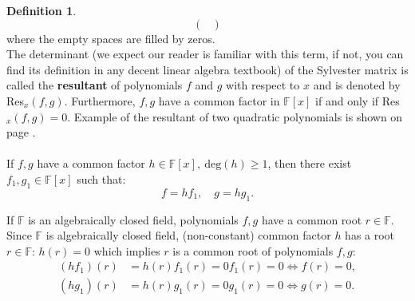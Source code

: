 \documentclass[thesis=M,english]{FITthesis}[2012/10/20]
\theoremstyle{remark}
\theoremstyle{definition}
\newtheorem{DF}{Definition}[section]
\begin{document}
\begin{DF}
$$\begin{pmatrix}
\end{pmatrix}
$$
where the empty spaces are filled by zeros. \\
\noindent The determinant (we expect our reader is familiar with this term, if not, you can find its definition in any decent linear algebra textbook) of the Sylvester matrix is called the \textbf{resultant} of polynomials $f$ and $g$ with respect to $x$ and is denoted by Res$_{x}(f,g)$. Furthermore, $f,g$ have a common factor in $\mathbb{F}[x]$ if and only if Res$_x(f,g) = 0$. Example of the resultant of two quadratic polynomials is shown on page \pageref{resExample}. \\ \\
\noindent If $f,g$ have a common factor $h \in \mathbb{F}[x],\ \text{deg}(h) \geq 1$, then there exist $f_1, g_1 \in \mathbb{F}[x]$ such that:
$$
f = hf_1, \quad g = hg_1.
$$
\end{DF}
\noindent If $\mathbb{F}$ is an algebraically closed field, polynomials $f,g$ have a common root $r \in \mathbb{F}$. Since $\mathbb{F}$ is algebraically closed field, (non-constant) common factor $h$ has a root $r \in \mathbb{F}$: $h(r) = 0$ which implies $r$ is a common root of polynomials $f,g$:
\begin{align*}
(hf_1)(r) &= h(r)f_1(r) = 0f_1(r) = 0 \Leftrightarrow f(r) = 0 ,\\
(hg_1)(r) &= h(r)g_1(r) = 0g_1(r) = 0 \Leftrightarrow g(r) = 0.\\
\end{align*}
\end{document}
